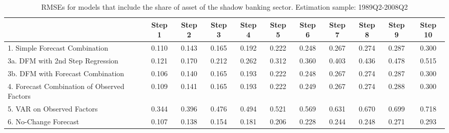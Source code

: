 \documentclass[12pt]{article}
\begin{document}
{\normalsize \clearpage
\begin{sidewaystable}
\caption{RMSEs for models that include the share of asset of the shadow banking sector. Estimation sample: 1989Q2-2008Q2}
\center
\begin{tabular}{|l|c|c|c|c|c|c|c|c|c|c|}
\hline
&Step 1 &Step 2 &Step 3 &Step 4 &Step 5 &Step 6 &Step 7 &Step 8 &Step 9 &Step 10\\
\hline
1. Simple Forecast Combination             &0.110&0.143&0.165&0.192&0.222&0.248&0.267&0.274&0.287&0.300\\
3a. DFM with 2nd Step Regression           &0.121&0.170&0.212&0.262&0.312&0.360&0.403&0.436&0.478&0.515\\
3b. DFM with Forecast Combination          &0.106&0.140&0.165&0.193&0.222&0.248&0.267&0.274&0.287&0.300\\
4. Forecast Combination of Observed Factors&0.109&0.141&0.165&0.193&0.222&0.249&0.267&0.274&0.288&0.300\\
5. VAR on Observed Factors                 &0.344&0.396&0.476&0.494&0.521&0.569&0.631&0.670&0.699&0.718\\
6. No-Change Forecast                      &0.107&0.138&0.154&0.181&0.206&0.228&0.244&0.248&0.271&0.293\\
\hline
\end{tabular}
\end{sidewaystable}
}
\end{document}
